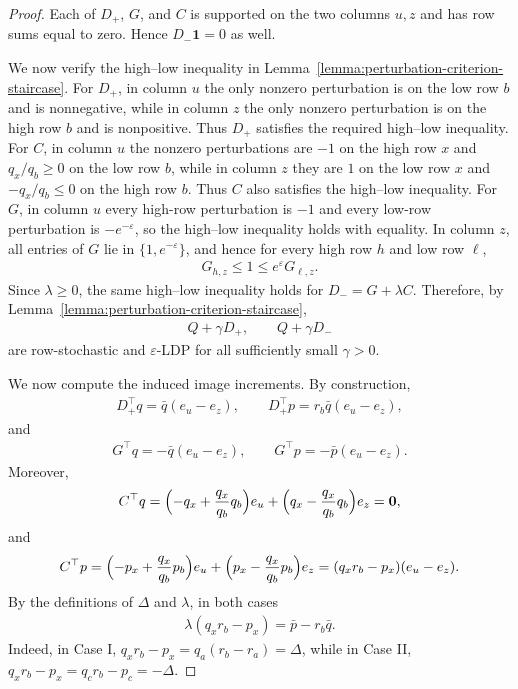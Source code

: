 \documentclass{article}
\theoremstyle{plain}
\theoremstyle{definition}
\theoremstyle{plain}
\begin{document}
\begin{proof}
Each of $D_+$, $G$, and $C$ is supported on the two columns $u,z$ and has row sums equal to zero. Hence $D_-\mathbf 1=0$ as well.

We now verify the high--low inequality in Lemma~\ref{lemma:perturbation-criterion-staircase}. For $D_+$, in column $u$ the only nonzero perturbation is on the low row $b$ and is nonnegative, while in column $z$ the only nonzero perturbation is on the high row $b$ and is nonpositive. Thus $D_+$ satisfies the required high--low inequality. For $C$, in column $u$ the nonzero perturbations are $-1$ on the high row $x$ and $q_x/q_b\ge 0$ on the low row $b$, while in column $z$ they are $1$ on the low row $x$ and $-q_x/q_b\le 0$ on the high row $b$. Thus $C$ also satisfies the high--low inequality. For $G$, in column $u$ every high-row perturbation is $-1$ and every low-row perturbation is $-e^{-\varepsilon}$, so the high--low inequality holds with equality. In column $z$, all entries of $G$ lie in $\{1,e^{-\varepsilon}\}$, and hence for every high row $h$ and low row $\ell$,
\begin{align*}
    G_{h,z}\le 1 \le e^\varepsilon G_{\ell,z}.
\end{align*}
Since $\lambda\ge 0$, the same high--low inequality holds for $D_-=G+\lambda C$. Therefore, by Lemma~\ref{lemma:perturbation-criterion-staircase},
\begin{align*}
    Q+\gamma D_+,\qquad Q+\gamma D_-
\end{align*}
are row-stochastic and $\varepsilon$-LDP for all sufficiently small $\gamma>0$.

We now compute the induced image increments. By construction,
\begin{align*}
    D_+^\top q=\bar q(e_u-e_z),
    \qquad
    D_+^\top p=r_b\bar q(e_u-e_z),
\end{align*}
and
\begin{align*}
    G^\top q=-\bar q(e_u-e_z),
    \qquad
    G^\top p=-\bar p(e_u-e_z).
\end{align*}
Moreover,
\begin{align*}
    C^\top q=
    \Bigl(-q_x+\frac{q_x}{q_b}q_b\Bigr)e_u
    +
    \Bigl(q_x-\frac{q_x}{q_b}q_b\Bigr)e_z
    =\mathbf 0,
\end{align*}
and
\begin{align*}
    C^\top p=
    \Bigl(-p_x+\frac{q_x}{q_b}p_b\Bigr)e_u
    +
    \Bigl(p_x-\frac{q_x}{q_b}p_b\Bigr)e_z
    =
    (q_xr_b-p_x)(e_u-e_z).
\end{align*}
By the definitions of $\Delta$ and $\lambda$, in both cases
\begin{align*}
    \lambda(q_xr_b-p_x)=\bar p-r_b\bar q.
\end{align*}
Indeed, in Case I, $q_xr_b-p_x=q_a(r_b-r_a)=\Delta$, while in Case II, $q_xr_b-p_x=q_c r_b-p_c=-\Delta$.


\end{proof}
\end{document}
